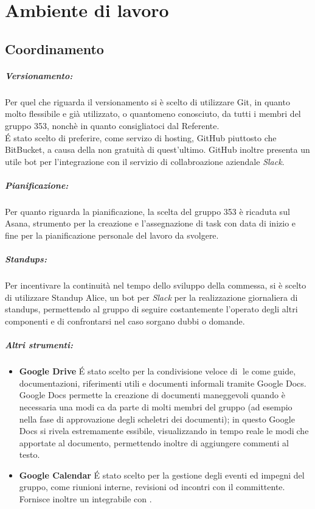 \documentclass[NormeDiProgetto.tex]{subfiles}
\begin{document}
	\section{Ambiente di lavoro}
	\subsection{Coordinamento}
\subparagraph{Versionamento:} Per quel che riguarda il versionamento si è scelto di utilizzare Git, in quanto molto flessibile e già utilizzato, o quantomeno conosciuto, da tutti i membri del gruppo 353, nonchè in quanto consigliatoci dal Referente.\\
		\'{E} stato scelto di preferire, come servizo di hosting, GitHub piuttosto che BitBucket, a causa della non gratuità di quest'ultimo. GitHub inoltre presenta un utile bot per l'integrazione con il servizio di collabroazione aziendale \emph{Slack}.
\subparagraph{Pianificazione:} Per quanto riguarda la pianificazione, la scelta del gruppo 353 è ricaduta sul Asana, strumento per la creazione e l'assegnazione di task con data di inizio e fine per la pianificazione personale del lavoro da svolgere.
\subparagraph{Standups:} Per incentivare la continuità nel tempo dello sviluppo della commessa, si è scelto di utilizzare Standup Alice, un bot per \emph{Slack} per la realizzazione giornaliera di standups, permettendo al gruppo di seguire costantemente l'operato degli altri componenti e di confrontarsi nel caso sorgano dubbi o domande.
\subparagraph{Altri strumenti:}
		\begin{itemize}
			\item \textbf{Google Drive} \'{E} stato scelto per la condivisione veloce di le come
			guide, documentazioni, riferimenti utili e documenti informali tramite
			Google Docs. Google Docs permette la creazione di documenti
			maneggevoli quando è necessaria una modica da parte di molti membri
			del gruppo (ad esempio nella fase di approvazione degli scheletri dei
			documenti); in questo Google Docs si rivela estremamente 
			essibile,
			visualizzando in tempo reale le modiche apportate al documento,
			permettendo inoltre di aggiungere commenti al testo.
			\item \textbf{Google Calendar} \'{E} stato scelto per la gestione degli eventi ed
			impegni del gruppo, come riunioni interne, revisioni od incontri con il committente. Fornisce
			inoltre un  integrabile con .
		\end{itemize}
\end{document}
